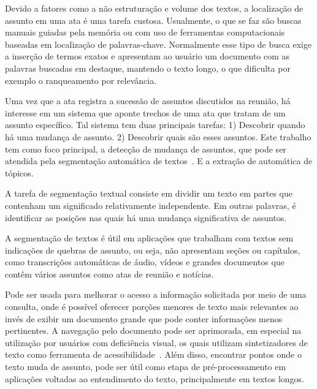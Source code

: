 %  
Devido a fatores como a não estruturação e volume dos textos, a localização de assunto em uma ata é uma tarefa custosa.  Usualmente, o que se faz são buscas manuais guiadas pela memória ou com uso de ferramentas computacionais baseadas em localização de palavras-chave.  Normalmente esse tipo de busca exige a inserção de termos exatos e 
apresentam ao usuário um documento com as palavras buscadas em destaque, mantendo o texto longo, o que dificulta por exemplo o ranqueamento por relevância. 






Uma vez que a ata registra a sucessão de assuntos discutidos na reunião, há interesse em um sistema que aponte trechos de uma ata que tratam de um assunto específico. Tal sistema tem duas principais tarefas: 1) Descobrir quando há uma mudança de assunto. 2) Descobrir quais são esses assuntos. Este trabalho tem como foco principal, a detecção de mudança de assuntos, que pode ser atendida pela segmentação automática de textos~\cite{Chen2017,Naili2016,Cardoso2017}. E a extração de automática de tópicos. 



A tarefa de segmentação textual consiste em dividir um texto em partes que contenham um significado relativamente independente. Em outras palavras, é identificar as posições nas quais há uma mudança significativa de assuntos. 

A segmentação de textos é útil em aplicações que trabalham com textos sem indicações de quebras de assunto, ou seja, não apresentam seções ou capítulos, como transcrições automáticas de áudio, vídeos e grandes documentos que contêm vários assuntos como atas de reunião e notícias.


Pode ser usada para melhorar o acesso a informação solicitada por meio de uma consulta, onde é possível oferecer porções menores de texto mais relevantes ao invés de exibir um documento grande que pode conter informações menos pertinentes. 
%
%
A navegação pelo documento pode ser aprimorada, em especial na utilização por usuários com deficiência visual, os quais utilizam  sintetizadores de texto como ferramenta de acessibilidade~\cite{Choi2000}. 
%
Além disso, encontrar pontos onde o texto muda de assunto, pode ser útil como etapa de pré-processamento em aplicações voltadas ao entendimento do texto, principalmente em textos longos.




